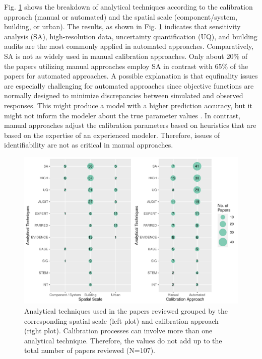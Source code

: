 \documentclass[review]{elsarticle}
\begin{document}
Fig. \ref{fig:analytical_approach} shows the breakdown of analytical techniques according to the calibration approach (manual or automated) and the spatial scale (component/system, building, or urban). The results, as shown in Fig. \ref{fig:analytical_approach} indicates that sensitivity analysis (SA), high-resolution data, uncertainty quantification (UQ), and building audits are the most commonly applied in automated approaches. Comparatively, SA is not as widely used in manual calibration approaches. Only about 20\% of the papers utilizing manual approaches employ SA in contrast with 65\% of the papers for automated approaches. A possible explanation is that equfinality issues are especially challenging for automated approaches since objective functions are normally designed to minimize discrepancies between simulated and observed responses. This might produce a model with a higher prediction accuracy, but it might not inform the modeler about the true parameter values \cite{beven2006manifesto}. In contrast, manual approaches adjust the calibration parameters based on heuristics that are based on the expertise of an experienced modeler. Therefore, issues of identifiability are not as critical in manual approaches. 

\begin{figure}[!h]
\centering
\includegraphics[width=\textwidth]{figures/approach_scale.pdf}
\caption{Analytical techniques used in the papers reviewed grouped by the corresponding spatial scale (left plot) and calibration approach (right plot). Calibration processes can involve more than one analytical technique. Therefore, the values do not add up to the total number of papers reviewed (N=107).}
\label{fig:analytical_approach}
\end{figure}
\end{document}
